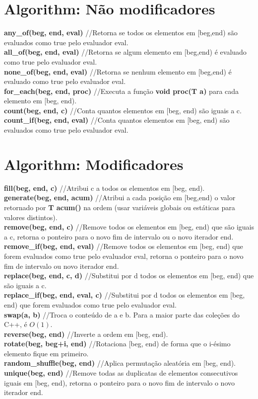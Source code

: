 \begin{multicols}{2}
\section{Algorithm: Não modificadores}
\textbf{any\_of(beg, end, eval)} //Retorna se todos os elementos em [beg,end) são evaluados como true pelo evaluador eval.\\
\textbf{all\_of(beg, end, eval)} //Retorna se algum elemento em [beg,end) é evaluado como true pelo evaluador eval.\\
\textbf{none\_of(beg, end, eval)} //Retorna se nenhum elemento em [beg,end) é evaluado como true pelo evaluador eval.\\
\textbf{for\_each(beg, end, proc)} //Executa a função \textbf{void proc(T a)} para cada elemento em [beg, end).\\
\textbf{count(beg, end, c)} //Conta quantos elementos em [beg, end) são iguais a c.\\
\textbf{count\_if(beg, end, eval)} //Conta quantos elementos em [beg, end) são evaluados como true pelo evaluador eval.

\section{Algorithm: Modificadores}
\textbf{fill(beg, end, c)} //Atribui c a todos os elementos em [beg, end).\\
\textbf{generate(beg, end, acum)} //Atribui a cada posição em [beg,end) o valor retornado por \textbf{T acum()} na ordem (usar variáveis globais ou estáticas para valores distintos).\\
\textbf{remove(beg, end, c)} //Remove todos os elementos em [beg, end) que são iguais a c, retorna o ponteiro para o novo fim de intervalo ou o novo iterador end.\\
\textbf{remove\_if(beg, end, eval)} //Remove todos os elementos em [beg, end) que forem evaluados como true pelo evaluador eval, retorna o ponteiro para o novo fim de intervalo ou novo iterador end.\\
\textbf{replace(beg, end, c, d)} //Substitui por d todos os elementos em [beg, end) que são iguais a c.\\
\textbf{replace\_if(beg, end, eval, c)} //Substitui por d todos os elementos em [beg, end) que forem evaluados como true pelo evaluador eval.\\
\textbf{swap(a, b)} //Troca o conteúdo de a e b. Para a maior parte das coleções do C++, é $O(1)$.\\
\textbf{reverse(beg, end)} //Inverte a ordem em [beg, end).\\
\textbf{rotate(beg, beg+i, end)} //Rotaciona [beg, end) de forma que o i-ésimo elemento fique em primeiro.\\
\textbf{random\_shuffle(beg, end)} //Aplica permutação aleatória em [beg, end).\\
\textbf{unique(beg, end)} //Remove todas as duplicatas de elementos consecutivos iguais em [beg, end), retorna o ponteiro para o novo fim de intervalo o novo iterador end.


\end{multicols}
